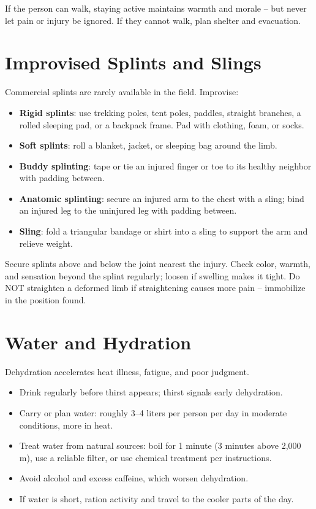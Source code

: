 If the person can walk, staying active maintains warmth and morale -- but never let pain or injury be ignored. If they cannot walk, plan shelter and evacuation.

\section{Improvised Splints and Slings}

Commercial splints are rarely available in the field. Improvise:

\begin{itemize}[leftmargin=*]
  \item \textbf{Rigid splints}: use trekking poles, tent poles, paddles, straight branches, a rolled sleeping pad, or a backpack frame. Pad with clothing, foam, or socks.
  \item \textbf{Soft splints}: roll a blanket, jacket, or sleeping bag around the limb.
  \item \textbf{Buddy splinting}: tape or tie an injured finger or toe to its healthy neighbor with padding between.
  \item \textbf{Anatomic splinting}: secure an injured arm to the chest with a sling; bind an injured leg to the uninjured leg with padding between.
  \item \textbf{Sling}: fold a triangular bandage or shirt into a sling to support the arm and relieve weight.
\end{itemize}

Secure splints above and below the joint nearest the injury. Check color, warmth, and sensation beyond the splint regularly; loosen if swelling makes it tight. Do NOT straighten a deformed limb if straightening causes more pain -- immobilize in the position found.

\section{Water and Hydration}

Dehydration accelerates heat illness, fatigue, and poor judgment.

\begin{itemize}[leftmargin=*]
  \item Drink regularly before thirst appears; thirst signals early dehydration.
  \item Carry or plan water: roughly 3--4 liters per person per day in moderate conditions, more in heat.
  \item Treat water from natural sources: boil for 1 minute (3 minutes above 2,000 m), use a reliable filter, or use chemical treatment per instructions.
  \item Avoid alcohol and excess caffeine, which worsen dehydration.
  \item If water is short, ration activity and travel to the cooler parts of the day.
\end{itemize}

